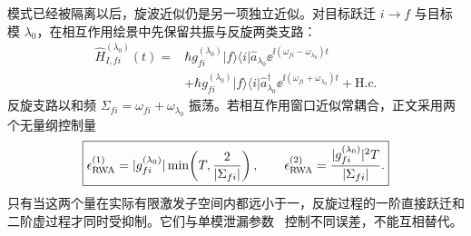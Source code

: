 模式已经被隔离以后，旋波近似仍是另一项独立近似。对目标跃迁 $i\to f$ 与目标模 $\lambda_0$，在相互作用绘景中先保留共振与反旋两类支路：
\begin{equation}
\boxed{
\begin{aligned}
\hat H_{I,fi}^{(\lambda_0)}(t)
={}&\hbar g_{fi}^{(\lambda_0)}|f\rangle\langle i|\hat a_{\lambda_0}
\ee^{\ii(\omega_{fi}-\omega_{\lambda_0})t}\\
&+\hbar g_{fi}^{(\lambda_0)}|f\rangle\langle i|\hat a_{\lambda_0}^\dagger
\ee^{\ii(\omega_{fi}+\omega_{\lambda_0})t}
+\mathrm{H.c.}
\end{aligned}}
\label{eq:single_mode_full_four_branch_interaction}
\end{equation}
反旋支路以和频 $\Sigma_{fi}=\omega_{fi}+\omega_{\lambda_0}$ 振荡。若相互作用窗口近似常耦合，正文采用两个无量纲控制量
\begin{equation}
 \boxed{
 \epsilon_{\rm RWA}^{(1)}
 =|g_{fi}^{(\lambda_0)}|
 \min\!\left(T,\frac{2}{|\Sigma_{fi}|}\right),
 \qquad
 \epsilon_{\rm RWA}^{(2)}
 =\frac{|g_{fi}^{(\lambda_0)}|^2T}{|\Sigma_{fi}|}.}
 \label{eq:rwa-finite-time-error-scales-dp68}
\end{equation}
只有当这两个量在实际有限激发子空间内都远小于一，反旋过程的一阶直接跃迁和二阶虚过程才同时受抑制。它们与单模泄漏参数~ 控制不同误差，不能互相替代。


